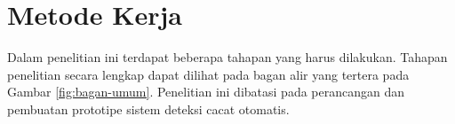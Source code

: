 \vspace{1em}

\section{Metode Kerja}
Dalam penelitian ini terdapat beberapa tahapan yang harus dilakukan.
Tahapan penelitian secara lengkap dapat dilihat pada bagan alir yang
tertera pada Gambar \ref{fig:bagan-umum}. Penelitian ini dibatasi
pada perancangan dan pembuatan prototipe sistem deteksi cacat otomatis.


